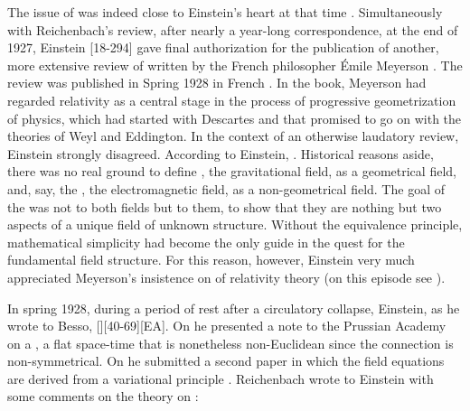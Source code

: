 \documentclass[draft]{article}
\begin{document}
The issue of  was indeed close to Einstein's heart at that time \citep{Lehmkuhl2014}. Simultaneously with Reichenbach's review, after nearly a year-long correspondence, at the end of 1927, Einstein [18-294] gave final authorization for the publication of another, more extensive review of  written by the French philosopher \'Emile Meyerson \citep{Meyerson1925}. The review was published in Spring 1928 in French \citep{Einstein1928b}. In the book, Meyerson had regarded relativity as a central stage in the process of progressive geometrization of physics, which had started with Descartes and that promised to go on with the theories of Weyl and Eddington. In the context of an otherwise laudatory review, Einstein strongly disagreed. According to Einstein,  \citep[165\me]{Einstein1928b}. Historical reasons aside, there was no real ground to define \gmn, the gravitational field, as a geometrical field, and, say, the \Fmn, the electromagnetic field, as a non-geometrical field. The goal of the \uftp was not to  both fields but to  them, to show that they are nothing but two aspects of a unique  field of unknown structure. Without the equivalence principle, mathematical simplicity had become the only guide in the quest for the fundamental field structure. For this reason, however, Einstein very much appreciated Meyerson's insistence on  of relativity theory (on this episode see ).

In spring 1928, during a period of rest after a circulatory collapse, Einstein, as he wrote to Besso, [][40-69][EA]. On  he presented a note to the Prussian Academy on a  \citep{Einstein19281}, a flat space-time that is nonetheless non-Euclidean since the connection is non-symmetrical. On  he submitted a second paper in which the field equations are derived from a variational principle \citep{Einstein19282}. Reichenbach wrote to Einstein with some comments on the theory on :
 
\end{document}
